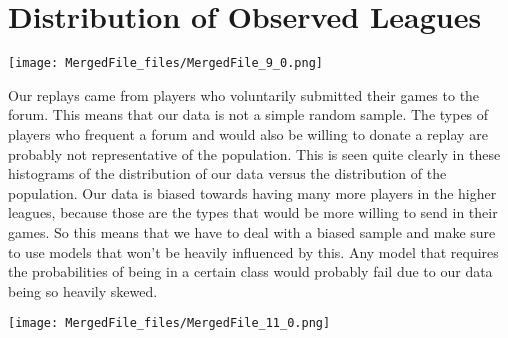 \documentclass[letterpaper,10pt,english]{/usr/share/sphinx/texinputs/sphinxhowto}
\newenvironment{InvisibleVerbatim}
        {\begin{mdframed}[leftmargin=0.1\linewidth,innerleftmargin=3pt,innerrightmargin=3pt, userdefinedwidth=1\linewidth, linewidth=0pt, linecolor=white, usetwoside=false]}
        {\end{mdframed}}
\begin{document}
\part{Distribution of Observed Leagues}

    

        
        

            
                \begin{InvisibleVerbatim}
                \vspace{-0.5\baselineskip}
    \begin{center}
    \texttt{[image: MergedFile\_files/MergedFile\_9\_0.png]}
    \par
    \end{center}
    
            \end{InvisibleVerbatim}
            
        
    
Our replays came from players who voluntarily submitted their games to
the forum. This means that our data is not a simple random sample. The
types of players who frequent a forum and would also be willing to
donate a replay are probably not representative of the population. This
is seen quite clearly in these histograms of the distribution of our
data versus the distribution of the population. Our data is biased
towards having many more players in the higher leagues, because those
are the types that would be more willing to send in their games. So this
means that we have to deal with a biased sample and make sure to use
models that won't be heavily influenced by this. Any model that requires
the probabilities of being in a certain class would probably fail due to
our data being so heavily skewed.

    

        
        

            
                \begin{InvisibleVerbatim}
                \vspace{-0.5\baselineskip}
    \begin{center}
    \texttt{[image: MergedFile\_files/MergedFile\_11\_0.png]}
    \par
    \end{center}
    
            \end{InvisibleVerbatim}
            
\end{document}
